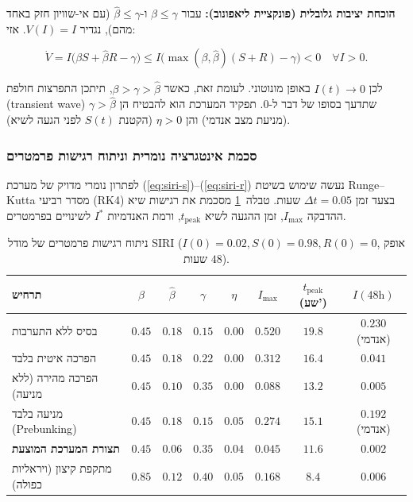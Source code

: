 \textbf{הוכחת יציבות גלובלית (פונקציית ליאפונוב):} עבור $\beta \le \gamma$ ו-$\hat{\beta} \le \gamma$ (עם אי-שוויון חזק באחד מהם), נגדיר $V(I) = I$. אזי:
\begin{english}
\begin{equation}
\dot{V} = I\big(\beta S + \hat{\beta} R - \gamma\big) \le I\big(\max(\beta, \hat{\beta})(S+R) - \gamma\big) < 0 \quad \forall I > 0.
\end{equation}
\end{english}
לכן $I(t) \to 0$ באופן מונוטוני. לעומת זאת, כאשר $\beta > \gamma > \hat{\beta}$, תיתכן התפרצות חולפת (\textenglish{transient wave}) שתדעך בסופו של דבר ל-$0$. תפקיד המערכת הוא להבטיח הן $\gamma > \hat{\beta}$ (מניעת מצב אנדמי) והן $\eta > 0$ (הקטנת $S(t)$ לפני הגעה לשיא).

\subsubsection{סכמת אינטגרציה נומרית וניתוח רגישות פרמטרים}
לפתרון נומרי מדויק של מערכת (\ref{eq:siri-s})--(\ref{eq:siri-r}) נעשה שימוש בשיטת \textenglish{Runge--Kutta} מסדר רביעי (\textenglish{RK4}) בצעד זמן $\Delta t = 0.05$ שעות. טבלה~\ref{tab:siri-sensitivity} מסכמת את רגישות שיא ההדבקה $I_{\max}$, זמן ההגעה לשיא $t_{\text{peak}}$, ורמת האנדמיות $I^*$ לשינויים בפרמטרים.

\begin{table}[htbp]
\centering
\caption{ניתוח רגישות פרמטרים של מודל \textenglish{SIRI} ($I(0)=0.02, S(0)=0.98, R(0)=0$, אופק $48$ שעות).}
\label{tab:siri-sensitivity}
\begin{tabular}{@{}lccccccc@{}}
\toprule
\textbf{תרחיש} & $\beta$ & $\hat{\beta}$ & $\gamma$ & $\eta$ & $I_{\max}$ & $t_{\text{peak}}$ (שע') & $I(48\text{h})$ \\
\midrule
בסיס ללא התערבות & $0.45$ & $0.18$ & $0.15$ & $0.00$ & $0.520$ & $19.8$ & $0.230$ (אנדמי) \\
הפרכה איטית בלבד & $0.45$ & $0.18$ & $0.22$ & $0.00$ & $0.312$ & $16.4$ & $0.041$ \\
הפרכה מהירה (ללא מניעה) & $0.45$ & $0.10$ & $0.35$ & $0.00$ & $0.088$ & $13.2$ & $0.005$ \\
מניעה בלבד (\textenglish{Prebunking}) & $0.45$ & $0.18$ & $0.15$ & $0.05$ & $0.274$ & $15.1$ & $0.192$ (אנדמי) \\
\textbf{תצורת המערכת המוצעת} & $\mathbf{0.45}$ & $\mathbf{0.06}$ & $\mathbf{0.35}$ & $\mathbf{0.04}$ & $\mathbf{0.045}$ & $\mathbf{11.6}$ & $\mathbf{0.002}$ \\
מתקפת קיצון (ויראליות כפולה) & $0.85$ & $0.12$ & $0.40$ & $0.05$ & $0.168$ & $8.4$ & $0.006$ \\
\bottomrule
\end{tabular}
\end{table}

